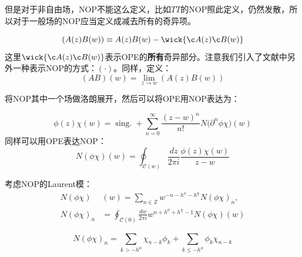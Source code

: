 但是对于非自由场，NOP不能这么定义，比如$TT$的NOP照此定义，仍然发散，所以对于一般场的NOP应当定义成减去所有的奇异项。
\begin{definition}
	\begin{equation}
		\left(A(z)B(w)\right)\equiv A(z)B(w)-\wick{\c A(z)\c B(w)}
	\end{equation}
	这里$\wick{\c A(z)\c B(w)}$表示OPE的\textbf{所有}奇异部分。注意我们引入了文献中另外一种表示NOP的方式：$\left(\cdot\right)$。同样，定义：
	\begin{equation}
		\left(AB\right)(w)=\lim_{z\to w} \left(A(z)B(w)\right)
	\end{equation}
\end{definition}
将NOP其中一个场做洛朗展开，然后可以将OPE用NOP表达为：
\begin{theorem}
	\begin{equation}
		\phi(z)\chi(w)=\operatorname{sing.}+\sum_{n=0}^\infty\frac{(z-w)^n}{n!}N\big(\partial^n\phi\chi\big)(w)
	\end{equation}
	同样可以用OPE表达NOP：
	\begin{equation}
		N\left(\phi\chi\right)(w)=\oint_{\mathcal{C}(w)}\frac{dz}{2\pi i}\frac{\phi(z)\chi(w)}{z-w}
	\end{equation}
\end{theorem}
考虑NOP的Laurent模：
\begin{equation}
	\begin{aligned}N\left(\phi\chi\right)&(w)=\sum_{n\in\mathbb{Z}}w^{-n-h^\phi-h^\chi}N\left(\phi\chi\right)_n,\\N\left(\phi\chi\right)_n&=\oint_{\mathcal{C}(0)}\frac{dw}{2\pi i}w^{n+h^\phi+h^\chi-1}N\left(\phi\chi\right)(w)\end{aligned}
\end{equation}
\begin{theorem}
	\begin{equation}
		\boxed{
		N\left(\phi\chi\right)_{n}=\sum_{k>-h^{\phi}}\chi_{n-k}\phi_{k}+\sum_{k\leq-h^{\phi}}\phi_{k}\chi_{n-k}
		}
	\end{equation}
\end{theorem}
